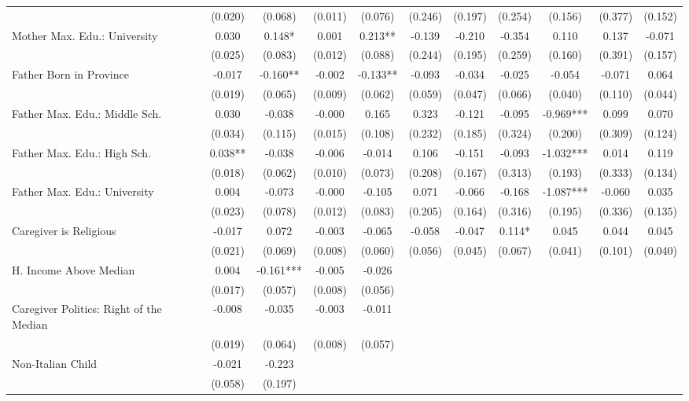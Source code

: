 \begin{tabular}{lcccccccccc}
 & (0.020) & (0.068) & (0.011) & (0.076) & (0.246) & (0.197) & (0.254) & (0.156) & (0.377) & (0.152) \\
Mother Max. Edu.: University & 0.030 & 0.148* & 0.001 & 0.213** & -0.139 & -0.210 & -0.354 & 0.110 & 0.137 & -0.071 \\
 & (0.025) & (0.083) & (0.012) & (0.088) & (0.244) & (0.195) & (0.259) & (0.160) & (0.391) & (0.157) \\
Father Born in Province & -0.017 & -0.160** & -0.002 & -0.133** & -0.093 & -0.034 & -0.025 & -0.054 & -0.071 & 0.064 \\
 & (0.019) & (0.065) & (0.009) & (0.062) & (0.059) & (0.047) & (0.066) & (0.040) & (0.110) & (0.044) \\
Father Max. Edu.: Middle Sch. & 0.030 & -0.038 & -0.000 & 0.165 & 0.323 & -0.121 & -0.095 & -0.969*** & 0.099 & 0.070 \\
 & (0.034) & (0.115) & (0.015) & (0.108) & (0.232) & (0.185) & (0.324) & (0.200) & (0.309) & (0.124) \\
Father Max. Edu.: High Sch. & 0.038** & -0.038 & -0.006 & -0.014 & 0.106 & -0.151 & -0.093 & -1.032*** & 0.014 & 0.119 \\
 & (0.018) & (0.062) & (0.010) & (0.073) & (0.208) & (0.167) & (0.313) & (0.193) & (0.333) & (0.134) \\
Father Max. Edu.: University & 0.004 & -0.073 & -0.000 & -0.105 & 0.071 & -0.066 & -0.168 & -1.087*** & -0.060 & 0.035 \\
 & (0.023) & (0.078) & (0.012) & (0.083) & (0.205) & (0.164) & (0.316) & (0.195) & (0.336) & (0.135) \\
Caregiver is Religious & -0.017 & 0.072 & -0.003 & -0.065 & -0.058 & -0.047 & 0.114* & 0.045 & 0.044 & 0.045 \\
 & (0.021) & (0.069) & (0.008) & (0.060) & (0.056) & (0.045) & (0.067) & (0.041) & (0.101) & (0.040) \\
H. Income Above Median & 0.004 & -0.161*** & -0.005 & -0.026 &  &  &  &  &  &  \\
 & (0.017) & (0.057) & (0.008) & (0.056) &  &  &  &  &  &  \\
Caregiver Politics: Right of the Median & -0.008 & -0.035 & -0.003 & -0.011 &  &  &  &  &  &  \\
 & (0.019) & (0.064) & (0.008) & (0.057) &  &  &  &  &  &  \\
Non-Italian Child & -0.021 & -0.223 &  &  &  &  &  &  &  &  \\
 & (0.058) & (0.197) &  &  &  &  &  &  &  &  \\

\end{tabular}
